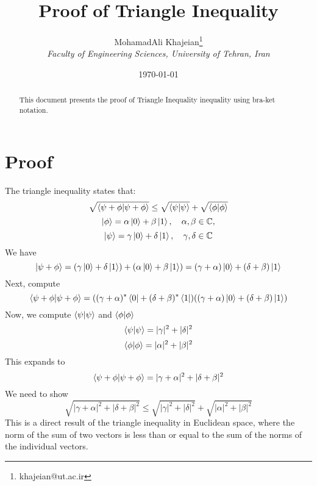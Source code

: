 \documentclass[12pt]{article}
\title{\textbf{Proof of Triangle Inequality}}
\author{
    MohamadAli Khajeian\footnote{khajeian@ut.ac.ir} \\ 
    \small \textit{Faculty of Engineering Sciences, University of Tehran, Iran} \\ 
}
\date{\today}
\begin{document}
\maketitle

\begin{abstract}
    This document presents the proof of Triangle Inequality inequality using bra-ket notation.
\end{abstract}

\section*{Proof}

The triangle inequality states that:
\begin{equation}
    \sqrt{\braket{\psi + \phi | \psi + \phi}} \leq \sqrt{\braket{\psi|\psi}} + \sqrt{\braket{\phi|\phi}}
\end{equation}
\[
\ket{\phi} = \alpha \ket{0} + \beta \ket{1}, \quad \alpha, \beta \in \mathbb{C},
\]
\[
\ket{\psi} = \gamma \ket{0} + \delta \ket{1}, \quad \gamma, \delta \in \mathbb{C}
\]
We have
\[
\ket{\psi + \phi} = (\gamma \ket{0} + \delta \ket{1}) + (\alpha \ket{0} + \beta \ket{1}) = (\gamma + \alpha) \ket{0} + (\delta + \beta) \ket{1}
\]
Next, compute
\[
\braket{\psi + \phi | \psi + \phi} = ((\gamma + \alpha)^* \bra{0} + (\delta + \beta)^* \bra{1})((\gamma + \alpha) \ket{0} + (\delta + \beta) \ket{1})
\]
Now, we compute \( \braket{\psi|\psi} \) and \( \braket{\phi|\phi} \)
\[
\braket{\psi|\psi} = |\gamma|^2 + |\delta|^2
\]
\[
\braket{\phi|\phi} = |\alpha|^2 + |\beta|^2
\]
This expands to
\[
\braket{\psi + \phi | \psi + \phi} = |\gamma + \alpha|^2 + |\delta + \beta|^2
\]
We need to show
\begin{equation}
\sqrt{|\gamma + \alpha|^2 + |\delta + \beta|^2} \leq \sqrt{|\gamma|^2 + |\delta|^2} + \sqrt{|\alpha|^2 + |\beta|^2}
\end{equation}
This is a direct result of the triangle inequality in Euclidean space, where the norm of the sum of two vectors is less than or equal to the sum of the norms of the individual vectors.
\end{document}
